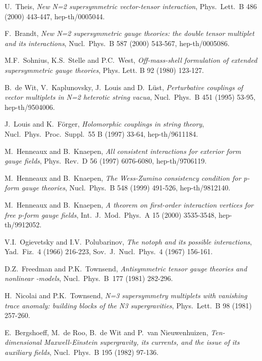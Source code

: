 \documentclass[a4paper,12pt]{article}
\begin{document}
\begin{thebibliography}{30}
U.\ Theis,
{\it New N=2 supersymmetric vector-tensor interaction},
Phys.\ Lett.\ B 486 (2000) 443-447, 
hep-th/0005044.

F.\ Brandt, 
{\it New N=2 supersymmetric gauge theories: 
the double tensor multiplet and its interactions},
Nucl.\ Phys.\ B 587 (2000) 543-567,
hep-th/0005086.

M.F.\ Sohnius, K.S.\ Stelle and P.C.\ West, 
{\it Off-mass-shell formulation of extended supersymmetric
gauge theories},
Phys. Lett. B 92 (1980) 123-127.

B.\ de Wit, V.\ Kaplunovsky, J.\ Louis and D.\ L\"ust,
{\it Perturbative couplings of vector multiplets in 
N=2 heterotic string vacua}, 
Nucl.\ Phys.\ B 451 (1995) 53-95, 
hep-th/9504006.

J.\ Louis and K.\ F\"orger,
{\it Holomorphic couplings in string theory},
Nucl.\ Phys.\ Proc.\ Suppl.\ 55 B (1997) 33-64,
hep-th/9611184.

M.\ Henneaux and B.\ Knaepen,
{\it All consistent interactions for exterior form gauge fields},
Phys.\ Rev.\ D 56 (1997) 6076-6080,
hep-th/9706119.

M.\ Henneaux and B.\ Knaepen,
{\it The Wess-Zumino consistency condition for p-form gauge theories},
Nucl.\ Phys.\ B 548 (1999) 491-526,
hep-th/9812140.

M.\ Henneaux and B.\ Knaepen,
{\it A theorem on first-order interaction vertices 
for free p-form gauge fields},
Int.\ J.\ Mod.\ Phys.\ A 15 (2000) 3535-3548,
hep-th/9912052.

V.I.\ Ogievetsky and I.V.\ Polubarinov, 
{\it The notoph and its possible interactions},
Yad.\ Fiz.\ 4 (1966) 216-223, 
Sov.\ J.\ Nucl.\ Phys.\ 4 (1967) 156-161.

D.Z.\ Freedman and P.K.\ Townsend, 
{\it Antisymmetric tensor gauge theories and nonlinear \myHighlight{$\sigma$}\coordHE{}-models},
Nucl.\ Phys.\ B\ 177 (1981) 282-296.

H.\ Nicolai and P.K.\ Townsend,
{\it N=3 supersymmetry multiplets with vanishing trace anomaly:
building blocks of the N\myHighlight{$>$}\coordHE{}3 supergravities},
Phys.\ Lett.\ B 98 (1981) 257-260.

E.\ Bergshoeff, M.\ de Roo, B.\ de Wit and P.\ van Nieuwenhuizen,
{\it Ten-dimensional Maxwell-Einstein supergravity, its currents,
and the issue of its auxiliary fields}, 
Nucl.\ Phys.\ B 195 (1982) 97-136.
  

\end{thebibliography}
\end{document}
